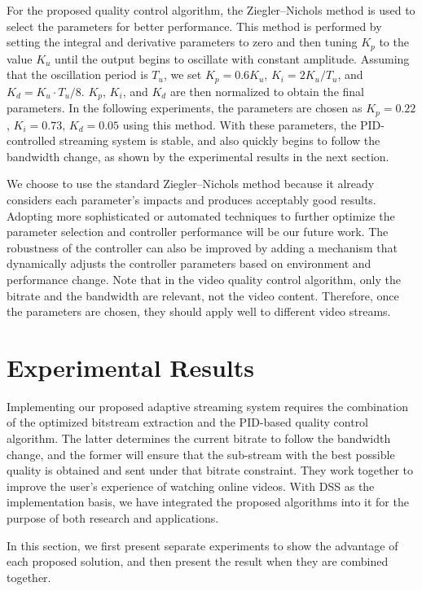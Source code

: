 \documentclass[journal]{IEEEtran}
\begin{document}
For the proposed quality control algorithm, the Ziegler--Nichols method \cite{Ziegler42} is used to select the parameters for better performance. This method is performed by setting the integral and derivative parameters to zero and then tuning $K_p$ to the value $K_u$ until the output begins to oscillate with constant amplitude. Assuming that the oscillation period is $T_u$, we set $K_p = 0.6K_u$, $K_i = 2K_u/T_u$, and $K_d = K_u \cdot T_u/8$. $K_p$, $K_i$, and $K_d$ are then normalized to obtain the final parameters. In the following experiments, the parameters are chosen as $K_p = 0.22$, $K_i = 0.73$, $K_d = 0.05$ using this method. With these parameters, the PID-controlled streaming system is stable, and also quickly begins to follow the bandwidth change, as shown by the experimental results in the next section.

We choose to use the standard Ziegler--Nichols method because it already considers each parameter's impacts and produces acceptably good results. Adopting more sophisticated or automated techniques to further optimize the parameter selection and controller performance will be our future work. The robustness of the controller can also be improved by adding a mechanism that dynamically adjusts the controller parameters based on environment and performance change. Note that in the video quality control algorithm, only the bitrate and the bandwidth are relevant, not the video content. Therefore, once the parameters are chosen, they should apply well to different video streams.


\section{Experimental Results}
\label{sec:experiment}

Implementing our proposed adaptive streaming system requires the combination of the optimized bitstream extraction and the PID-based quality control algorithm. The latter determines the current bitrate to follow the bandwidth change, and the former will ensure that the sub-stream with the best possible quality is obtained and sent under that bitrate constraint. They work together to improve the user's experience of watching online videos. With DSS as the implementation basis, we have integrated the proposed algorithms into it for the purpose of both research and applications.

In this section, we first present separate experiments to show the advantage of each proposed solution, and then present the result when they are combined together.
\end{document}
